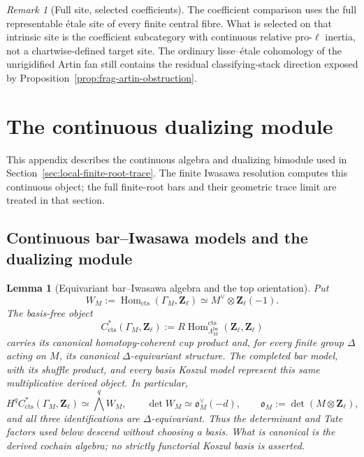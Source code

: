 \documentclass[11pt]{article}
\newtheorem{lemma}[theorem]{Lemma}
\theoremstyle{definition}
\theoremstyle{remark}
\newtheorem{remark}[theorem]{Remark}
\begin{document}
\begin{remark}[Full site, selected coefficients]
The coefficient comparison uses the full representable \'{e}tale site of every finite central
fibre.  What is selected on that intrinsic site is the coefficient subcategory with
continuous relative pro-$\ell$ inertia, not a chartwise-defined target site.
The ordinary lisse--\'{e}tale cohomology of the unrigidified Artin fan still
contains the residual classifying-stack direction exposed by
Proposition~\ref{prop:frag-artin-obstruction}.
\end{remark}


\section{The continuous dualizing module}
\label{sec:frag-iwasawa}

This appendix describes the continuous algebra and dualizing bimodule
used in Section~\ref{sec:local-finite-root-trace}.  The finite Iwasawa
resolution computes this continuous object; the full finite-root
bars and their geometric trace limit are treated in that section.

\subsection{Continuous bar--Iwasawa models and the dualizing module}


\begin{lemma}[Equivariant bar--Iwasawa algebra and the top orientation]
\label{lem:frag-equivariant-bar-iwasawa}
Put
\[
 W_M:=\operatorname{Hom}_{\mathrm{cts}}(\Gamma_M,\mathbf Z_\ell)
      \simeq M^\vee\otimes\mathbf Z_\ell(-1).
\]
The basis-free object
\[
 C^*_{\mathrm{cts}}(\Gamma_M,\mathbf Z_\ell)
 :=R\!\operatorname{Hom}^{\mathrm{cts}}_{\Lambda_M^{\mathrm{Iw}}}
      (\mathbf Z_\ell,\mathbf Z_\ell)
\]
carries its canonical homotopy-coherent cup product and, for every finite
group $\Delta$ acting on $M$, its canonical $\Delta$-equivariant structure.
The completed bar model, with its shuffle product, and every basis Koszul
model represent this same multiplicative derived object.  In particular,
\begin{equation}
 H^q C^*_{\mathrm{cts}}(\Gamma_M,\mathbf Z_\ell)
   \simeq \bigwedge^q W_M,
 \qquad
 \det W_M\simeq\mathfrak o_M^\vee(-d),
 \qquad
 \mathfrak o_M:=\det(M\otimes\mathbf Z_\ell),
 \label{eq:frag-equivariant-top-orientation}
\end{equation}
and all three identifications are $\Delta$-equivariant.  Thus the determinant
and Tate factors used below descend without choosing a basis.  What is
canonical is the derived cochain algebra; no strictly functorial Koszul basis
is asserted.
\end{lemma}
\end{document}
